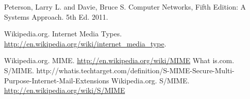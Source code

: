 \documentclass[twocolumn,showpacs,%
  nofootinbib,aps,superscriptaddress,%
  eqsecnum,prd,notitlepage,showkeys,10pt]{revtex4-1}
\begin{document}
\begin{thebibliography}{9}

 Peterson, Larry L. and Davie, Bruce S. Computer Networks, Fifth Edition: A Systems Approach. 5th Ed. 2011.

 Wikipedia.org. Internet Media Types. \url{http://en.wikipedia.org/wiki/internet_media_type}.

 Wikipedia.org. MIME. \url{http://en.wikipedia.org/wiki/MIME}
 What is.com. S/MIME.  http://whatis.techtarget.com/definition/S-MIME-Secure-Multi-Purpose-Internet-Mail-Extensions
 Wikipedia.org. S/MIME. 
\url{http://en.wikipedia.org/wiki/S/MIME}




\end{thebibliography}
\end{document}
